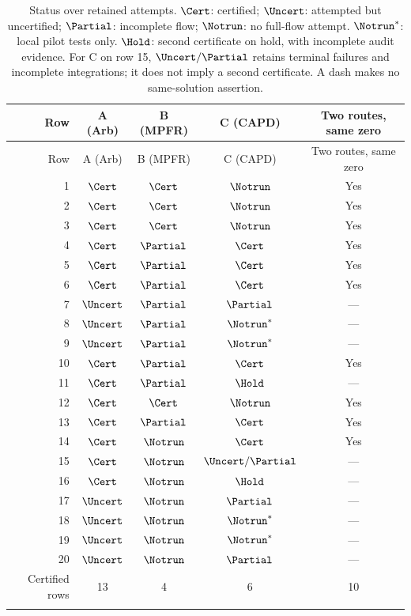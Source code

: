 \begin{longtable}{@{}rcccc@{}}
\toprule
Row & A (Arb) & B (MPFR) & C (CAPD) & Two routes, same zero\\
\midrule
\endfirsthead
\toprule
Row & A (Arb) & B (MPFR) & C (CAPD) & Two routes, same zero\\
\midrule
\endhead
1 & $\Cert$ & $\Cert$ & $\Notrun$ & Yes\\
2 & $\Cert$ & $\Cert$ & $\Notrun$ & Yes\\
3 & $\Cert$ & $\Cert$ & $\Notrun$ & Yes\\
4 & $\Cert$ & $\Partial$ & $\Cert$ & Yes\\
5 & $\Cert$ & $\Partial$ & $\Cert$ & Yes\\
6 & $\Cert$ & $\Partial$ & $\Cert$ & Yes\\
7 & $\Uncert$ & $\Partial$ & $\Partial$ & ---\\
8 & $\Uncert$ & $\Partial$ & $\Notrun^{*}$ & ---\\
9 & $\Uncert$ & $\Partial$ & $\Notrun^{*}$ & ---\\
10 & $\Cert$ & $\Partial$ & $\Cert$ & Yes\\
11 & $\Cert$ & $\Partial$ & $\Hold$ & ---\\
12 & $\Cert$ & $\Cert$ & $\Notrun$ & Yes\\
13 & $\Cert$ & $\Partial$ & $\Cert$ & Yes\\
14 & $\Cert$ & $\Notrun$ & $\Cert$ & Yes\\
15 & $\Cert$ & $\Notrun$ & $\Uncert/\Partial$ & ---\\
16 & $\Cert$ & $\Notrun$ & $\Hold$ & ---\\
17 & $\Uncert$ & $\Notrun$ & $\Partial$ & ---\\
18 & $\Uncert$ & $\Notrun$ & $\Notrun^{*}$ & ---\\
19 & $\Uncert$ & $\Notrun$ & $\Notrun^{*}$ & ---\\
20 & $\Uncert$ & $\Notrun$ & $\Partial$ & ---\\
\midrule
Certified rows & 13 & 4 & 6 & 10\\
\bottomrule
\caption{Status over retained attempts. $\Cert$: certified;
$\Uncert$: attempted but uncertified; $\Partial$: incomplete flow;
$\Notrun$: no full-flow attempt. $\Notrun^{*}$: local pilot tests only.
$\Hold$: second certificate on hold, with incomplete audit evidence.
For C on row 15, $\Uncert/\Partial$ retains terminal failures and
incomplete integrations; it does not imply a second certificate. A dash makes no
same-solution assertion.}
\label{tab:rows}
\end{longtable}
